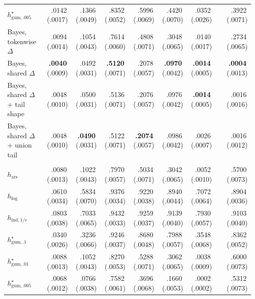\documentclass[11pt]{article}
\newcommand{\mcse}[2]{\mbox{#1\,{\fontsize{7}{8}\selectfont(#2)}}}
\newcommand{\bestmcse}[2]{\mbox{\textbf{#1}\,{\fontsize{7}{8}\selectfont(#2)}}}
\begin{document}
\begin{table}[p]
\begin{tabular}{@{}lrrrrrrcr@{}}
$h^\star_{\mathrm{gum},.005}$ & \mcse{.0142}{.0017} & \mcse{.1366}{.0049} & \mcse{.8352}{.0052} & \mcse{.5996}{.0069} & \mcse{.4420}{.0070} & \mcse{.0352}{.0026} & & \mcse{.3922}{.0071} \\
\addlinespace[1pt]
Bayes, tokenwise $\Delta$ & \mcse{.0094}{.0014} & \mcse{.1054}{.0043} & \mcse{.7614}{.0060} & \mcse{.4808}{.0071} & \mcse{.3048}{.0065} & \mcse{.0140}{.0017} & & \mcse{.2734}{.0065} \\
Bayes, shared $\Delta$ & \bestmcse{.0040}{.0009} & \mcse{.0492}{.0031} & \bestmcse{.5120}{.0071} & \mcse{.2078}{.0057} & \bestmcse{.0970}{.0042} & \bestmcse{.0014}{.0005} & & \bestmcse{.0004}{.0013} \\
Bayes, shared $\Delta$ $+$ tail shape & \mcse{.0048}{.0010} & \mcse{.0500}{.0031} & \mcse{.5136}{.0071} & \mcse{.2076}{.0057} & \mcse{.0976}{.0042} & \bestmcse{.0014}{.0005} & & \mcse{.0016}{.0016} \\
Bayes, shared $\Delta$ $+$ union tail & \mcse{.0048}{.0010} & \bestmcse{.0490}{.0031} & \mcse{.5122}{.0071} & \bestmcse{.2074}{.0057} & \mcse{.0986}{.0042} & \mcse{.0026}{.0007} & & \mcse{.0016}{.0012} \\
\addlinespace[3pt]
\multicolumn{9}{@{}l}{\textit{Horizon $n=700$}}\\
$h_{\mathrm{ars}}$ & \mcse{.0080}{.0013} & \mcse{.1022}{.0043} & \mcse{.7970}{.0057} & \mcse{.5034}{.0071} & \mcse{.3042}{.0065} & \mcse{.0052}{.0010} & & \mcse{.5700}{.0073} \\
$h_{\log}$ & \mcse{.0610}{.0034} & \mcse{.5834}{.0070} & \mcse{.9376}{.0034} & \mcse{.9220}{.0038} & \mcse{.8940}{.0044} & \mcse{.7072}{.0064} & & \mcse{.8904}{.0036} \\
$h_{\mathrm{ind},1/e}$ & \mcse{.0803}{.0038} & \mcse{.7033}{.0065} & \mcse{.9432}{.0033} & \mcse{.9259}{.0037} & \mcse{.9139}{.0040} & \mcse{.7930}{.0057} & & \mcse{.9103}{.0040} \\
$h^\star_{\mathrm{gum},.1}$ & \mcse{.0340}{.0026} & \mcse{.3236}{.0066} & \mcse{.9246}{.0037} & \mcse{.8680}{.0048} & \mcse{.7988}{.0057} & \mcse{.3548}{.0068} & & \mcse{.8362}{.0052} \\
$h^\star_{\mathrm{gum},.01}$ & \mcse{.0088}{.0013} & \mcse{.1052}{.0043} & \mcse{.8270}{.0053} & \mcse{.5288}{.0071} & \mcse{.3062}{.0065} & \mcse{.0038}{.0009} & & \mcse{.6000}{.0073} \\
$h^\star_{\mathrm{gum},.005}$ & \mcse{.0068}{.0012} & \mcse{.0766}{.0038} & \mcse{.7582}{.0061} & \mcse{.3696}{.0068} & \mcse{.1660}{.0053} & \mcse{.0002}{.0002} & & \mcse{.5312}{.0073} \\

\end{tabular}
\end{table}
\end{document}
